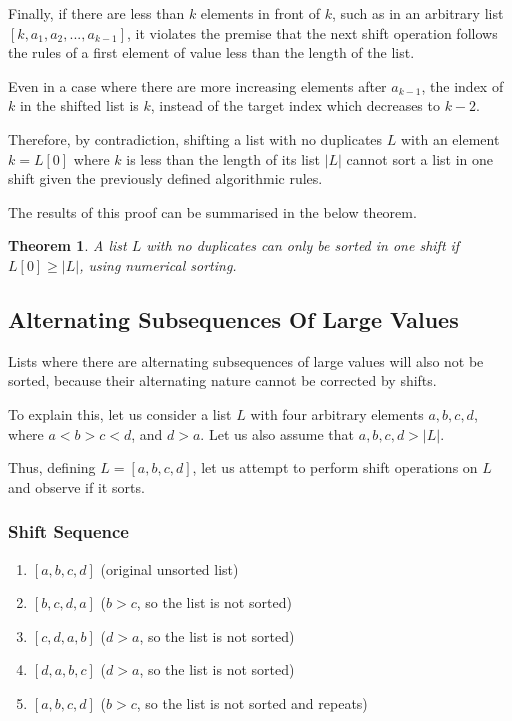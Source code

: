 \documentclass[12pt]{article}
\newtheorem{theorem}{Theorem}[section]
\begin{document}
Finally, if there are less than $k$ elements in front of $k$, such as in an arbitrary list $[k, a_1, a_2, ..., a_{k-1}]$, it violates the premise that the next shift operation follows the rules of a first element of value less than the length of the list.

Even in a case where there are more increasing elements after $a_{k-1}$, the index of $k$ in the shifted list is $k$, instead of the target index which decreases to $k-2$.

Therefore, by contradiction, shifting a list with no duplicates $L$ with an element $k = L[0]$ where $k$ is less than the length of its list $|L|$ cannot sort a list in one shift given the previously defined algorithmic rules.

The results of this proof can be summarised in the below theorem.

\begin{theorem}
A list $L$ with no duplicates can only be sorted in one shift if
$L[0] \geq |L|$, using numerical sorting.
\end{theorem}

\subsection{Alternating Subsequences Of Large Values}
Lists where there are alternating subsequences of large values will also not be sorted, because their alternating nature cannot be corrected by shifts.

To explain this, let us consider a list $L$ with four arbitrary elements $a, b, c, d$, where $a < b > c < d$, and $d > a$. Let us also assume that $a, b, c, d > |L|$.

Thus, defining $L = [a, b, c, d]$, let us attempt to perform shift operations on $L$ and observe if it sorts.

\subsubsection{Shift Sequence}
\begin{enumerate}[start=0]
    \item $[a, b, c, d]$ (original unsorted list)
    \item $[b, c, d, a]$ ($b > c$, so the list is not sorted)
    \item $[c, d, a, b]$ ($d > a$, so the list is not sorted)
    \item $[d, a, b, c]$ ($d > a$, so the list is not sorted)
    \item $[a, b, c, d]$ ($b > c$, so the list is not sorted and repeats)
\end{enumerate}
\end{document}
